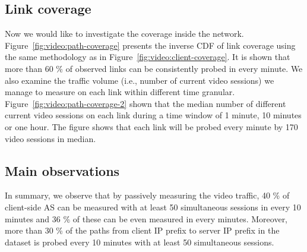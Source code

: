 \subsection{Link coverage} Now we would like to investigate the coverage inside the network. Figure~\ref{fig:video:path-coverage} presents the inverse CDF of link coverage using the same methodology as in Figure~\ref{fig:video:client-coverage}. 
It is shown that more than 60 \% of observed links can be consistently probed in every minute. 
We also examine the traffic volume (i.e., number of current video sessions) we manage to measure on each link within different time granular. Figure~\ref{fig:video:path-coverage-2} shown that the median number of different current video sessions on each link during a time window of 1 minute, 10 minutes or one hour. The figure shows that each link will be probed every minute by 170 video sessions in median.

\subsection{Main observations}

In summary, we observe that by passively measuring the video traffic, 40 \% of
client-side AS can be measured with at least 50 simultaneous sessions in every
10 minutes and 36 \% of these can be even measured in every minutes. Moreover,
more than 30 \% of the paths from client IP prefix to server IP prefix in the
dataset is probed every 10 minutes with at least 50 simultaneous sessions.  



